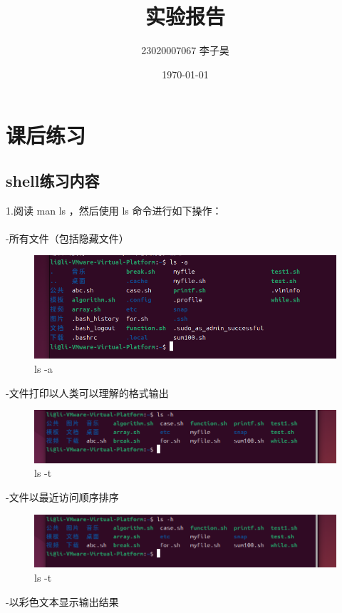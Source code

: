 \documentclass[a4paper, 12pt]{article}
\title{实验报告}
\author{23020007067 李子昊}
\date{\today}
\begin{document}
\maketitle

\large \tableofcontents
\newpage
{}

\section{课后练习}
 \subsection{{\color{red}shell练习内容}}
 {\noindent 1.阅读 man ls ，然后使用 ls 命令进行如下操作：
\\
\\
\indent -所有文件（包括隐藏文件）
\vspace{-10pt}
\begin{figure}[H]
  \centering
  \includegraphics[width=1\textwidth]{屏幕截图 2024-09-05 133654.png}
  \caption{ls -a}
    \end{figure}
    
\indent -文件打印以人类可以理解的格式输出 
\vspace{-10pt}
\begin{figure}[H]
  \centering
  \includegraphics[width=1\textwidth]{屏幕截图 2024-09-05 133743.png}
  \caption{ls -t}
    \end{figure}
    
\indent -文件以最近访问顺序排序
\vspace{-10pt}
\begin{figure}[H]
  \centering
  \includegraphics[width=1\textwidth]{屏幕截图 2024-09-05 133743.png}
  \caption{ls -t}
    \end{figure}
 \clearpage   
\indent -以彩色文本显示输出结果}
\end{document}
